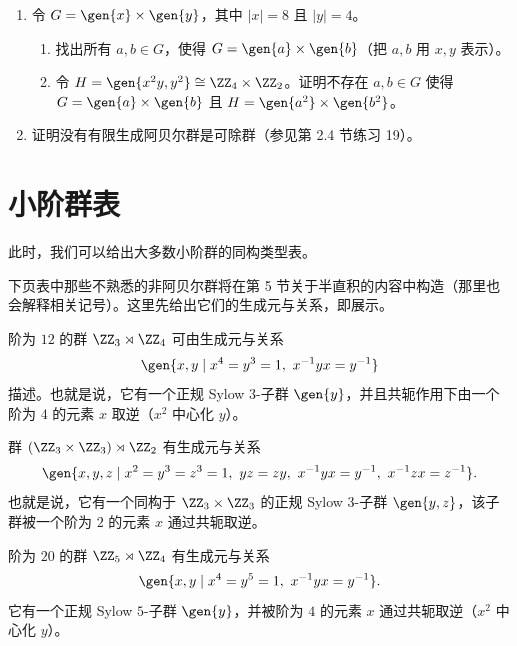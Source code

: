\begin{enumerate}[label=\arabic*.]
  \item 令 $G=\gen{x}\times\gen{y}$，其中 $|x|=8$ 且 $|y|=4$。
  \begin{enumerate}[label=(\alph*)]
    \item 找出所有 $a,b\in G$，使得 $G=\gen{a}\times\gen{b}$（把 $a,b$ 用 $x,y$ 表示）。
    \item 令 $H=\gen{x^2y,y^2}\cong\ZZ_4\times\ZZ_2$。证明不存在 $a,b\in G$ 使得 $G=\gen{a}\times\gen{b}$ 且 $H=\gen{a^2}\times\gen{b^2}$。
  \end{enumerate}

  \item 证明没有有限生成阿贝尔群是可除群（参见第 2.4 节练习 19）。
\end{enumerate}

\section{小阶群表}

此时，我们可以给出大多数小阶群的同构类型表。

下页表中那些不熟悉的非阿贝尔群将在第 5 节关于半直积的内容中构造（那里也会解释相关记号）。这里先给出它们的生成元与关系，即展示。

阶为 $12$ 的群 $\ZZ_3\rtimes\ZZ_4$ 可由生成元与关系
\[
  \gen{x,y\mid x^4=y^3=1,
\ x^{-1}yx=y^{-1}}
\]
描述。也就是说，它有一个正规 Sylow $3$-子群 $\gen{y}$，并且共轭作用下由一个阶为 $4$ 的元素 $x$ 取逆（$x^2$ 中心化 $y$）。

群 $(\ZZ_3\times\ZZ_3)\rtimes\ZZ_2$ 有生成元与关系
\[
  \gen{x,y,z\mid x^2=y^3=z^3=1,
\ yz=zy,
\ x^{-1}yx=y^{-1},
\ x^{-1}zx=z^{-1}}.
\]
也就是说，它有一个同构于 $\ZZ_3\times\ZZ_3$ 的正规 Sylow $3$-子群 $\gen{y,z}$，该子群被一个阶为 $2$ 的元素 $x$ 通过共轭取逆。

阶为 $20$ 的群 $\ZZ_5\rtimes\ZZ_4$ 有生成元与关系
\[
  \gen{x,y\mid x^4=y^5=1,
\ x^{-1}yx=y^{-1}}.
\]
它有一个正规 Sylow $5$-子群 $\gen{y}$，并被阶为 $4$ 的元素 $x$ 通过共轭取逆（$x^2$ 中心化 $y$）。

